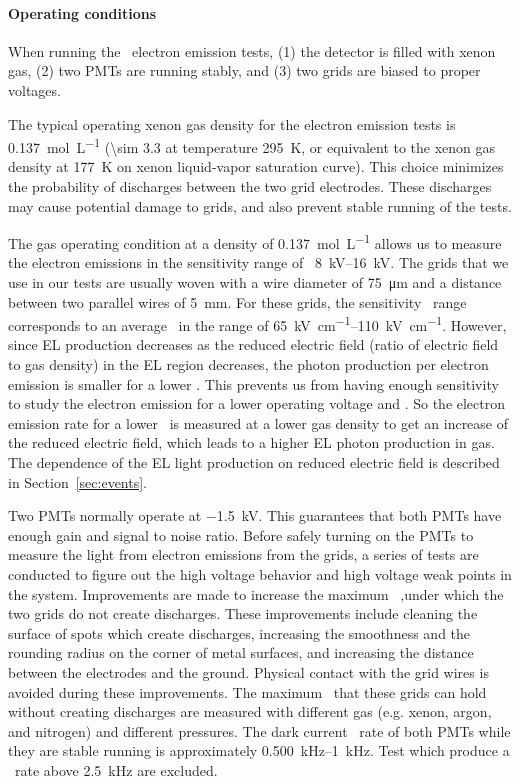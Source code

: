 \paragraph{Operating conditions} %
When running the \gtest\ electron emission tests, (1) the detector is filled with xenon gas, (2) two PMTs are running stably, and (3) two grids are biased to proper voltages. 

The typical operating xenon gas density for the electron emission tests is \SI{0.137}{\mole\per\liter}  (\SI{\sim 3.3}{\bara} at temperature \SI{295}{\kelvin}, or equivalent to the xenon gas density at \SI{177}{\kelvin} on xenon liquid-vapor saturation curve). 
This choice minimizes the probability of discharges between the two grid electrodes. %
These discharges may cause potential damage to grids, and also prevent stable running of the tests. 

The gas operating condition at a density of \SI{0.137}{\mole\per\liter} allows us to measure the electron emissions in the sensitivity range of \opdv\ \SIrange{8}{16}{\kV}. The grids that we use in our tests are usually woven with a wire diameter of  \SI{75}{\um} and a distance between two parallel wires of \SI{5}{mm}. For these grids, the sensitivity \opdv\ range corresponds to an average \wsef\ in the range of \SIrange{65}{110}{\kV\per\cm}. However, since EL production decreases as the reduced electric field (ratio of electric field to gas density) in the EL region decreases, the photon production per electron emission is smaller for a lower \opdv . This prevents us from having enough sensitivity to study the electron emission for a lower operating voltage and \wsef . So the electron emission rate for a lower \wsef\ is measured at a lower gas density to get an increase of the reduced electric field, which leads to a higher EL photon production in gas. The dependence of the EL light production on reduced electric field is described in Section~\ref{sec:events}.

Two PMTs normally operate at \SI{-1.5}{\kV}. This guarantees that both PMTs have enough gain and signal to noise ratio. Before safely turning on the PMTs to measure the light from electron emissions from the grids, a series of tests are conducted to figure out the high voltage behavior and high voltage weak points in the system. Improvements are made to increase the maximum \opvtvb\ ,under which the two grids do not create discharges. These improvements include cleaning the surface of spots which create discharges, increasing the smoothness and the rounding radius on the corner of metal surfaces, and increasing the distance between the electrodes and the ground. Physical contact with the grid wires is avoided during these improvements. The maximum \opvtvb\ that these grids can hold without creating discharges are measured with different gas (e.g. xenon, argon, and nitrogen) and different pressures. The dark current \sphe\ rate of both PMTs while they are stable running is approximately \SIrange{0.500}{1}{\kHz}. Test which produce a \sphe\ rate above \SI{2.5}{\kHz} are excluded. 

